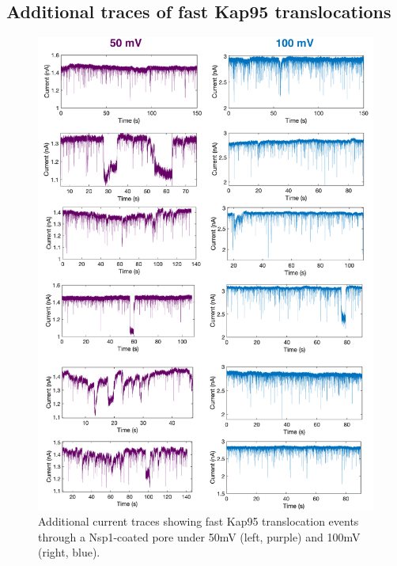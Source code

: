\newpage
\subsection{Additional traces of fast Kap95 translocations}

\begin{figure}[!htbp]
	\centering
	\includegraphics[width=0.9\linewidth]{figures/Figure7.6.png}
	\caption{Additional current traces showing fast Kap95 translocation events through a Nsp1-coated pore under 50mV (left, purple) and 100mV (right, blue).}
	\label{fig:fig7.6}
\end{figure}


\newpage
\renewcommand{\thefigure}{\thechapter.\arabic{figure}}
\renewcommand{\thetable}{\thechapter.\arabic{table}}
\renewcommand{\theequation}{\thechapter.\arabic{equation}}
